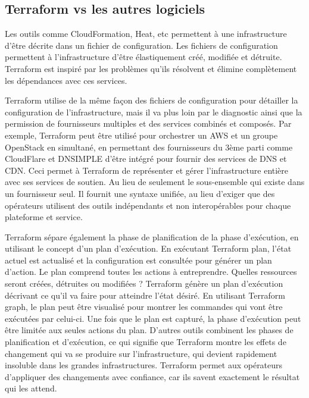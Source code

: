 \documentclass[]{article}
\begin{document}
\subsection{Terraform vs les autres
logiciels}\label{terraform-vs-les-autres-logiciels}
Les outils comme CloudFormation, Heat, etc permettent à une
infrastructure d'être décrite dans un fichier de configuration. Les
fichiers de configuration permettent à l'infrastructure d'être
élastiquement créé, modifiée et détruite.
 Terraform est inspiré par les
problèmes qu'ils résolvent et élimine complètement les dépendances avec ces services.

Terraform utilise de la même façon des fichiers de configuration pour
détailler la configuration de l'infrastructure, mais il va plus loin par
le diagnostic ainsi que la permission de fournisseurs multiples et des
services combinés et composés. Par exemple, Terraform peut être utilisé
pour orchestrer un AWS et un groupe OpenStack en simultané, en
permettant des fournisseurs du 3ème parti comme CloudFlare et DNSIMPLE
d'être intégré pour fournir des services de DNS et CDN. Ceci permet à
Terraform de représenter et gérer l'infrastructure entière avec ses
services de soutien. Au lieu de seulement le sous-ensemble qui existe
dans un fournisseur seul. Il fournit une syntaxe unifiée, au lieu
d'exiger que des opérateurs utilisent des outils indépendants et
non interopérables pour chaque plateforme et service.

Terraform sépare également la phase de planification de la phase
d'exécution, en utilisant le concept d'un plan d'exécution. En exécutant
Terraform plan, l'état actuel est actualisé et la configuration est
consultée pour générer un plan d'action. Le plan comprend toutes les
actions à entreprendre. Quelles ressources seront créées, détruites ou
modifiées ? Terraform génère un plan d'exécution décrivant ce qu'il va
faire pour atteindre l'état désiré. En utilisant Terraform graph, le
plan peut être visualisé pour montrer les commandes qui vont être
exécutées par celui-ci. Une fois que le plan est capturé, la phase
d'exécution peut être limitée aux seules actions du plan. D'autres
outils combinent les phases de planification et d'exécution, ce qui
signifie que Terraform montre les effets de changement qui va se
produire sur l'infrastructure, qui devient rapidement insoluble dans les
grandes infrastructures. Terraform permet aux opérateurs d'appliquer des
changements avec confiance, car ils savent exactement le résultat qui les attend.
\end{document}
